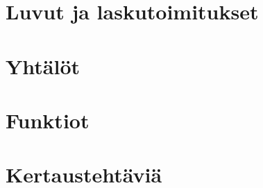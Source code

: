\chapter{Luvut ja laskutoimitukset}
    
    
    
    
    
    
    
    
    

\chapter{Yhtälöt}
    
    
    
    
    
    

\chapter{Funktiot}
    
    
    
    
    

\chapter{Kertaustehtäviä}
    
    
    
